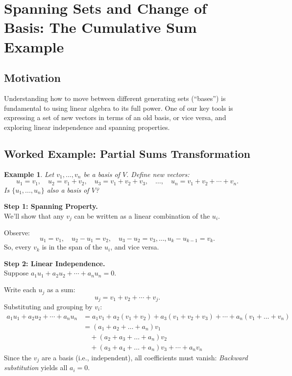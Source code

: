\documentclass[12pt]{article}
\newtheorem{example}[theorem]{Example}
\begin{document}
\section{Spanning Sets and Change of Basis: The Cumulative Sum Example}

\subsection{Motivation}

Understanding how to move between different generating sets (``bases'') is fundamental to using linear algebra to its full power. One of our key tools is expressing a set of new vectors in terms of an old basis, or vice versa, and exploring linear independence and spanning properties.

\subsection{Worked Example: Partial Sums Transformation}

\begin{example}
Let $v_1, ..., v_n$ be a basis of $V$. Define new vectors:
\[
u_1 = v_1,\quad u_2 = v_1 + v_2,\quad u_3 = v_1 + v_2 + v_3,\quad \dotsc,\quad u_n = v_1 + v_2 + \dotsb + v_n.
\]
Is $\{u_1, ..., u_n\}$ also a basis of $V$?
\end{example}

\textbf{Step 1: Spanning Property.} \\
We'll show that any $v_j$ can be written as a linear combination of the $u_i$.

Observe:
\[
u_1 = v_1,\quad u_2 - u_1 = v_2,\quad u_3 - u_2 = v_3, \ldots, u_k - u_{k-1} = v_k.
\]
So, every $v_k$ is in the span of the $u_i$, and vice versa.

\textbf{Step 2: Linear Independence.} \\
Suppose $a_1 u_1 + a_2 u_2 + \cdots + a_n u_n = 0$.

Write each $u_j$ as a sum:
\[
u_j = v_1 + v_2 + \dotsb + v_j.
\]
Substituting and grouping by $v_i$:
\begin{align*}
a_1 u_1 + a_2 u_2 + \cdots + a_n u_n 
&= a_1 v_1 + a_2 (v_1 + v_2) + a_3 (v_1 + v_2 + v_3) + \cdots + a_n (v_1 + \ldots + v_n)\\
&= (a_1 + a_2 + \ldots + a_n) v_1 \\
&\quad+ (a_2 + a_3 + \ldots + a_n) v_2 \\
&\quad+ (a_3 + a_4 + \ldots + a_n) v_3 + \cdots + a_n v_n
\end{align*}
Since the $v_j$ are a basis (i.e., independent), all coefficients must vanish:
\textit{Backward substitution} yields all $a_i = 0$.
\end{document}
